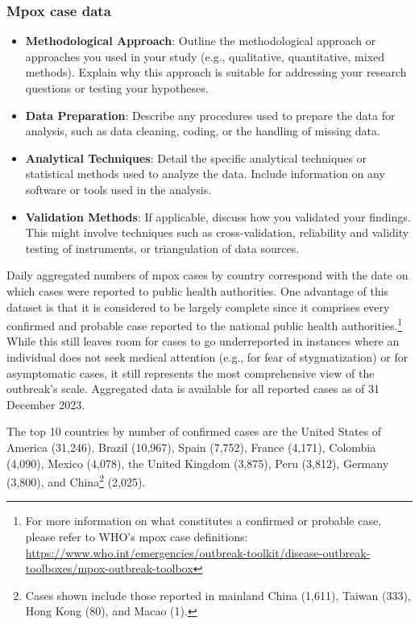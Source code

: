 \documentclass[
  12pt,
]{article}
\begin{document}
\subsubsection{Mpox case data}\label{mpox-case-data}

\begin{itemize}
\item
  \textbf{Methodological Approach}: Outline the methodological approach
  or approaches you used in your study (e.g., qualitative, quantitative,
  mixed methods). Explain why this approach is suitable for addressing
  your research questions or testing your hypotheses.
\item
  \textbf{Data Preparation}: Describe any procedures used to prepare the
  data for analysis, such as data cleaning, coding, or the handling of
  missing data.
\item
  \textbf{Analytical Techniques}: Detail the specific analytical
  techniques or statistical methods used to analyze the data. Include
  information on any software or tools used in the analysis.
\item
  \textbf{Validation Methods}: If applicable, discuss how you validated
  your findings. This might involve techniques such as cross-validation,
  reliability and validity testing of instruments, or triangulation of
  data sources.
\end{itemize}

Daily aggregated numbers of mpox cases by country correspond with the
date on which cases were reported to public health authorities. One
advantage of this dataset is that it is considered to be largely
complete since it comprises every confirmed and probable case reported
to the national public health authorities.\footnote{For more information
  on what constitutes a confirmed or probable case, please refer to
  WHO's mpox case definitions:
  \url{https://www.who.int/emergencies/outbreak-toolkit/disease-outbreak-toolboxes/mpox-outbreak-toolbox}}
While this still leaves room for cases to go underreported in instances
where an individual does not seek medical attention (e.g., for fear of
stygmatization) or for asymptomatic cases, it still represents the most
comprehensive view of the outbreak's scale. Aggregated data is available
for all reported cases as of 31 December 2023.

The top 10 countries by number of confirmed cases are the United States
of America (31,246), Brazil (10,967), Spain (7,752), France (4,171),
Colombia (4,090), Mexico (4,078), the United Kingdom (3,875), Peru
(3,812), Germany (3,800), and China\footnote{Cases shown include those
  reported in mainland China (1,611), Taiwan (333), Hong Kong (80), and
  Macao (1).} (2,025).
\end{document}
